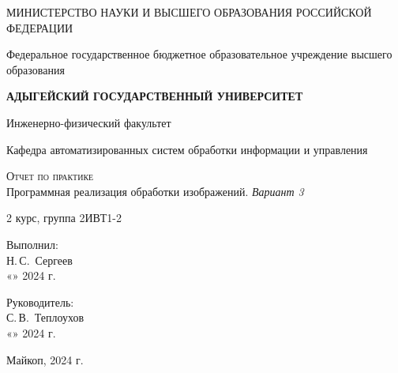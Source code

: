 \documentclass[12pt,a4paper]{scrartcl}
\begin{document}
 \begin{titlepage}
  \begin{center}
   \large
   МИНИСТЕРСТВО НАУКИ И ВЫСШЕГО ОБРАЗОВАНИЯ РОССИЙСКОЙ ФЕДЕРАЦИИ
   
   Федеральное государственное бюджетное образовательное учреждение высшего образования
   
   \textbf{АДЫГЕЙСКИЙ ГОСУДАРСТВЕННЫЙ УНИВЕРСИТЕТ}
   \vspace{0.25cm}
   
   Инженерно-физический факультет
   
   Кафедра автоматизированных систем обработки информации и управления
   \vfill

   \vfill
   
   \textsc{Отчет по практике}\\[5mm]
   
   {\LARGE Программная реализация обработки изображений. \textit{Вариант 3}}
   \bigskip
   
   2 курс, группа 2ИВТ1-2
  \end{center}
  \vfill
  
  \newlength{\ML}
  \hfill\begin{minipage}{0.5\textwidth}
   Выполнил:\\
   \underline{\hspace{\ML}} Н.\,С.~Сергеев\\
   «\underline{\hspace{0.7cm}}» \underline{\hspace{2cm}} 2024 г.
  \end{minipage}%
  \bigskip
  
  \hfill\begin{minipage}{0.5\textwidth}
   Руководитель:\\
   \underline{\hspace{\ML}} С.\,В.~Теплоухов\\
   «\underline{\hspace{0.7cm}}» \underline{\hspace{2cm}} 2024 г.
  \end{minipage}%
  \vfill
  
  \begin{center}
   Майкоп, 2024 г.
  \end{center}
 \end{titlepage}
 
\end{document}
